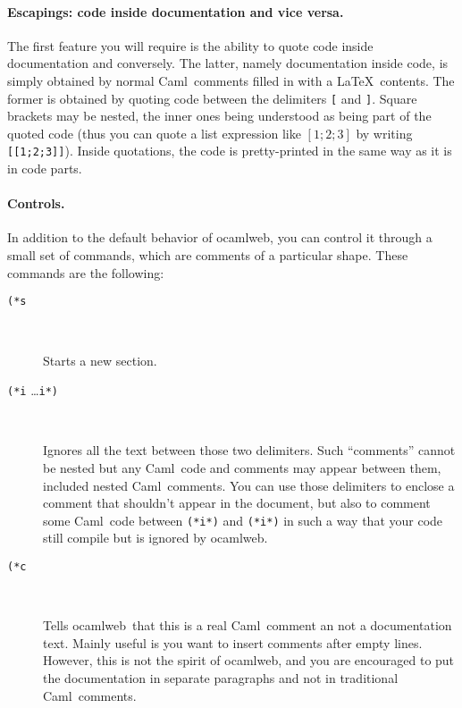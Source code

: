 \documentclass[12pt]{article}
\newcommand{\Caml}{\textsf{Caml}}
\newcommand{\ocamlweb}{\textsf{ocamlweb}}
\begin{document}
\paragraph{Escapings: code inside documentation and vice versa.}
The first feature you will require is the ability to quote code inside
documentation and conversely. The latter, namely documentation inside
code, is simply obtained by normal \Caml\ comments filled in with a
\LaTeX\ contents. The former is obtained by quoting code between the
delimiters \texttt{[} and \texttt{]}. Square brackets may be nested,
the inner ones being understood as being part of the quoted code (thus
you can quote a list expression like $[1;2;3]$ by writing
\texttt{[[1;2;3]]}). Inside quotations, the code is pretty-printed in
the same way as it is in code parts.


\paragraph{Controls.}
In addition to the default behavior of \ocamlweb, you can control it
through a small set of commands, which are comments of a particular
shape. These commands are the following:
\begin{description}

\item[\texttt{(*s}] ~\par
  
  Starts a new section.

\item[\texttt{(*i} \quad\dots\quad \texttt{i*)}] ~\par
  
  Ignores all the text between those two delimiters.  Such ``comments''
  cannot be nested but any \Caml\ code and comments may appear between
  them, included nested \Caml\ comments.  You can use those delimiters
  to enclose a comment that shouldn't appear in the document, but also
  to comment some \Caml\ code between \texttt{(*i*)} and
  \texttt{(*i*)} in such a way that your code still compile but is
  ignored by \ocamlweb.

\item[\texttt{(*c}] ~\par
  
  Tells \ocamlweb\ that this is a real \Caml\ comment an not a
  documentation text. Mainly useful is you want to insert comments
  after empty lines. However, this is not the spirit of \ocamlweb, and
  you are encouraged to put the documentation in separate paragraphs
  and not in traditional \Caml\ comments.

\end{description}
\end{document}
